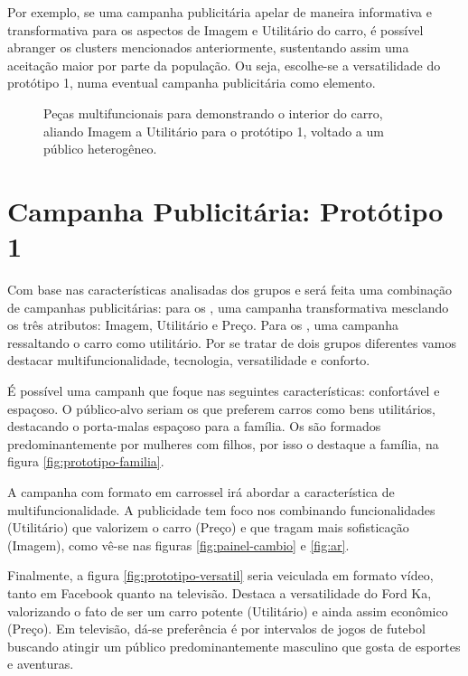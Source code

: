 Por exemplo, se uma campanha publicitária apelar de maneira informativa
e transformativa para os aspectos de Imagem e Utilitário do carro,
é possível abranger os clusters mencionados anteriormente, sustentando
assim uma aceitação maior por parte da população. Ou seja, escolhe-se
a versatilidade do protótipo 1, numa eventual campanha publicitária
como elemento.

\begin{figure}
\begin{centering}
\par\end{centering}
\caption{Peças multifuncionais para demonstrando o interior do carro, aliando Imagem a Utilitário para o protótipo 1, voltado a um público heterogêneo.}
\end{figure}


\section{Campanha Publicitária: Protótipo 1}

Com base nas características analisadas dos grupos \nomeCa{} e \nomeCd{}
será feita uma combinação de campanhas publicitárias: para os \nomeCa{},
uma campanha transformativa mesclando os três atributos: Imagem, Utilitário
e Preço. Para os \nomeCd{}, uma campanha ressaltando o carro como
utilitário. Por se tratar de dois grupos diferentes vamos destacar
multifuncionalidade, tecnologia, versatilidade e conforto.

É possível uma campanh que foque nas seguintes características: confortável
e espaçoso. O público-alvo seriam os \nomeCd{} que preferem carros
como bens utilitários, destacando o porta-malas espaçoso para a família.
Os \nomeCd{} são formados predominantemente por mulheres com filhos,
por isso o destaque a família, na figura \ref{fig:prototipo-familia}.

A campanha com formato em carrossel irá abordar a característica de
multifuncionalidade. A publicidade tem foco nos \nomeCa{} combinando
funcionalidades (Utilitário) que valorizem o carro (Preço) e que tragam
mais sofisticação (Imagem), como vê-se nas figuras \ref{fig:painel-cambio}
e \ref{fig:ar}.

Finalmente, a figura \ref{fig:prototipo-versatil} seria veiculada
em formato vídeo, tanto em Facebook quanto na televisão. Destaca a
versatilidade do Ford Ka\texttrademark, valorizando o fato de ser
um carro potente (Utilitário) e ainda assim econômico (Preço). Em
televisão, dá-se preferência é por intervalos de jogos de futebol
buscando atingir um público predominantemente masculino que gosta
de esportes e aventuras. 

